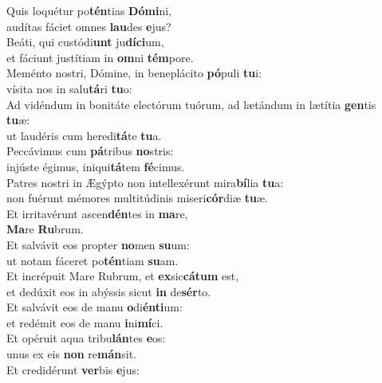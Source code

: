 \evenverse Quis loquétur po\textbf{tén}tias \textbf{Dó}\textbf{mi}ni,~\*\\
\evenverse audítas fáciet omnes \textbf{lau}des \textbf{e}jus?\\
\oddverse Beáti, qui custódi\textbf{unt} ju\textbf{dí}\textbf{ci}um,~\*\\
\oddverse et fáciunt justítiam in \textbf{om}ni \textbf{tém}pore.\\
\evenverse Meménto nostri, Dómine, in beneplácito \textbf{pó}puli \textbf{tu}i:~\*\\
\evenverse vísita nos in salu\textbf{tá}ri \textbf{tu}o:\\
\oddverse Ad vidéndum in bonitáte electórum tuórum, ad lætándum in lætítia \textbf{gen}tis \textbf{tu}æ:~\*\\
\oddverse ut laudéris cum heredi\textbf{tá}te \textbf{tu}a.\\
\evenverse Peccávimus cum \textbf{pá}tribus \textbf{no}stris:~\*\\
\evenverse injúste égimus, iniqui\textbf{tá}tem \textbf{fé}cimus.\\
\oddverse Patres nostri in Ægýpto non intellexérunt mira\textbf{bí}lia \textbf{tu}a:~\*\\
\oddverse non fuérunt mémores multitúdinis miseri\textbf{cór}diæ \textbf{tu}æ.\\
\evenverse Et irritavérunt ascen\textbf{dén}tes in \textbf{ma}re,~\*\\
\evenverse \textbf{Ma}re \textbf{Ru}brum.\\
\oddverse Et salvávit eos propter \textbf{no}men \textbf{su}um:~\*\\
\oddverse ut notam fáceret po\textbf{tén}tiam \textbf{su}am.\\
\evenverse Et incrépuit Mare Rubrum, et \textbf{ex}sic\textbf{cá}\textbf{tum} est,~\*\\
\evenverse et dedúxit eos in abýssis sicut \textbf{in} de\textbf{sér}to.\\
\oddverse Et salvávit eos de manu \textbf{o}di\textbf{én}\textbf{ti}um:~\*\\
\oddverse et redémit eos de manu \textbf{i}ni\textbf{mí}ci.\\
\evenverse Et opéruit aqua tribu\textbf{lán}tes \textbf{e}os:~\*\\
\evenverse unus ex eis \textbf{non} re\textbf{mán}sit.\\
\oddverse Et credidérunt \textbf{ver}bis \textbf{e}jus:~\*\\

